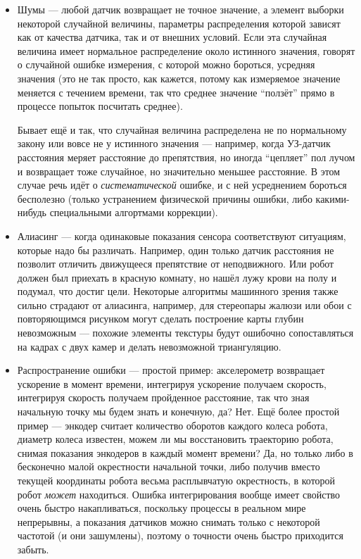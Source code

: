 \documentclass{../../text-style}
\begin{document}
\begin{itemize}
    \item Шумы --- любой датчик возвращает не точное значение, а элемент выборки некоторой случайной величины, параметры распределения которой зависят как от качества датчика, так и от внешних условий.
    Если эта случайная величина имеет нормальное распределение около истинного значения, говорят о случайной ошибке измерения, с которой можно бороться, усредняя значения (это не так просто, как кажется, потому как измеряемое значение меняется с течением времени, так что среднее значение \enquote{ползёт} прямо в процессе попыток посчитать среднее).

    Бывает ещё и так, что случайная величина распределена не по нормальному закону или вовсе не у истинного значения --- например, когда УЗ-датчик расстояния меряет расстояние до препятствия, но иногда \enquote{цепляет} пол лучом и возвращает тоже случайное, но значительно меньшее расстояние.
    В этом случае речь идёт о \emph{систематической} ошибке, и с ней усреднением бороться бесполезно (только устранением физической причины ошибки, либо какими-нибудь специальными алгортмами коррекции).

    \item Алиасинг --- когда одинаковые показания сенсора соответствуют ситуациям, которые надо бы различать.
    Например, один только датчик расстояния не позволит отличить движущееся препятствие от неподвижного.
    Или робот должен был приехать в красную комнату, но нашёл лужу крови на полу и подумал, что достиг цели.
    Некоторые алгоритмы машинного зрения также сильно страдают от алиасинга, например, для стереопары жалюзи или обои с повторяющимся рисунком могут сделать построение карты глубин невозможным --- похожие элементы текстуры будут ошибочно сопоставляться на кадрах с двух камер и делать невозможной триангуляцию.

    \item Распространение ошибки --- простой пример: акселерометр возвращает ускорение в момент времени, интегрируя ускорение получаем скорость, интегрируя скорость получаем пройденное расстояние, так что зная начальную точку мы будем знать и конечную, да?
    Нет.
    Ещё более простой пример --- энкодер считает количество оборотов каждого колеса робота, диаметр колеса известен, можем ли мы восстановить траекторию робота, снимая показания энкодеров в каждый момент времени?
    Да, но только либо в бесконечно малой окрестности начальной точки, либо получив вместо текущей координаты робота весьма расплывчатую окрестность, в которой робот \emph{может} находиться.
    Ошибка интегрирования вообще имеет свойство очень быстро накапливаться, поскольку процессы в реальном мире непрерывны, а показания датчиков можно снимать только с некоторой частотой (и они зашумлены), поэтому о точности очень быстро приходится забыть.
\end{itemize}
\end{document}

